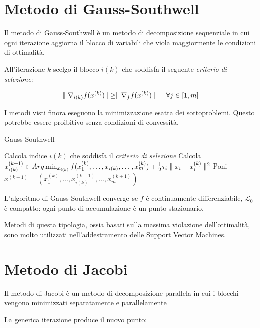 \section{Metodo di Gauss-Southwell}
\label{sec:methods.decomposition.gauss-southwell}
Il metodo di Gauss-Southwell è un metodo di decomposizione sequenziale in cui ogni iterazione aggiorna il blocco di variabili che viola maggiormente le condizioni di ottimalità.

All'iterazione $k$ scelgo il blocco $i(k)$ che soddisfa il seguente \textit{criterio di selezione}:

\begin{equation}
  \label{eqn:methods.decomposition.gauss-southwell.condition}
  \parallel \nabla_{i(k)}f(x^{(k)}) \parallel\geq\parallel \nabla_{j}f(x^{(k)}) \parallel\quad\forall j\in[1,m]
\end{equation}

I metodi visti finora eseguono la minimizzazione esatta dei sottoproblemi. Questo potrebbe essere proibitivo senza condizioni di convessità.

\begin{algorithm}
  \label{alg:methods.decomposition.gauss-southwell}
  \caption{Gauss-Southwell}

   {
    Calcola indice $i(k)$ che soddisfa il \textit{criterio di selezione}
    Calcola
      $x_{i(k)}^{(k+1)}\in Arg \min_{x_{i(k)}} f(x_{1}^{(k)},\ldots,x_{i(k)},\ldots,x_{m}^{(k)}) + \frac{1}{2}\tau_{i}\parallel x_{i}-x_{i}^{(k)} \parallel^2$
    Poni $x^{(k+1)}=(x_{1}^{(k)},\ldots,x_{i(k)}^{(k+1)},\ldots,x_{m}^{(k+1)})$
  }
\end{algorithm}

L'algoritmo di Gauss-Southwell converge se $f$ è continuamente differenziabile, $\mathcal{L}_{0}$ è compatto: ogni punto di accumulazione è un punto stazionario.

Metodi di questa tipologia, ossia basati sulla massima violazione dell'ottimalità, sono molto utilizzati nell'addestramento delle Support Vector Machines.


\section{Metodo di Jacobi}
\label{sec:methods.decomposition.jacobi}
Il metodo di Jacobi è un metodo di decomposizione parallela in cui i blocchi vengono minimizzati separatamente e parallelamente

La generica iterazione produce il nuovo punto:

